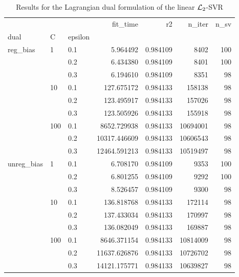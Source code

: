 \begin{table}[H]
\centering
\caption{Results for the Lagrangian dual formulation of the linear $\protect \mathcal{L}_2$-SVR}
\label{linear_lagrangian_dual_l2_svr_cv_results}
\begin{tabular}{lllrrrr}
\toprule
           &     &     &      fit\_time &        r2 &    n\_iter &  n\_sv \\
dual & C & epsilon &               &           &           &       \\
\midrule
reg\_bias & 1   & 0.1 &      5.964492 &  0.984109 &      8402 &   100 \\
           &     & 0.2 &      6.434380 &  0.984109 &      8401 &   100 \\
           &     & 0.3 &      6.194610 &  0.984109 &      8351 &    98 \\
           & 10  & 0.1 &    127.675172 &  0.984133 &    158138 &    98 \\
           &     & 0.2 &    123.495917 &  0.984133 &    157026 &    98 \\
           &     & 0.3 &    123.505926 &  0.984133 &    155918 &    98 \\
           & 100 & 0.1 &   8652.729938 &  0.984133 &  10694001 &    98 \\
           &     & 0.2 &  10317.446609 &  0.984133 &  10606543 &    98 \\
           &     & 0.3 &  12464.591213 &  0.984133 &  10519497 &    98 \\
unreg\_bias & 1   & 0.1 &      6.708170 &  0.984109 &      9353 &   100 \\
           &     & 0.2 &      6.801255 &  0.984109 &      9292 &   100 \\
           &     & 0.3 &      8.526457 &  0.984109 &      9300 &    98 \\
           & 10  & 0.1 &    136.818768 &  0.984133 &    172114 &    98 \\
           &     & 0.2 &    137.433034 &  0.984133 &    170997 &    98 \\
           &     & 0.3 &    136.082049 &  0.984133 &    169887 &    98 \\
           & 100 & 0.1 &   8646.371154 &  0.984133 &  10814009 &    98 \\
           &     & 0.2 &  11637.626876 &  0.984133 &  10726702 &    98 \\
           &     & 0.3 &  14121.175771 &  0.984133 &  10639827 &    98 \\
\bottomrule
\end{tabular}
\end{table}
